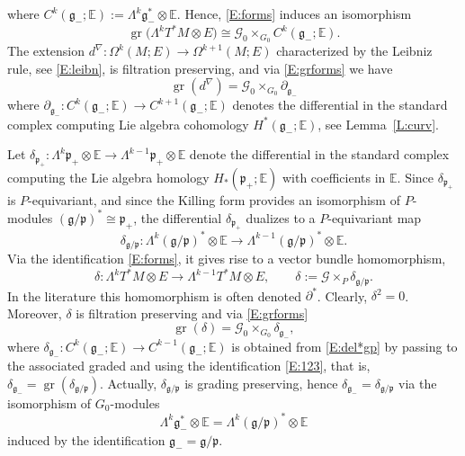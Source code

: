 \documentclass[reqno,12pt]{amsart}
\DeclareMathOperator{\gr}{gr}
\newcommand\goe{\mathfrak g}
\newcommand\poe{\mathfrak p}
\theoremstyle{plain}
\theoremstyle{definition}
\begin{document}
where $C^k(\goe_-;\mathbb E):=\Lambda^k\goe_-^*\otimes\mathbb E$. 
Hence, \eqref{E:forms} induces an isomorphism
\begin{equation}\label{E:grforms}
\gr\bigl(\Lambda^kT^*M\otimes E\bigr)
\cong\mathcal G_0\times_{G_0}C^k(\goe_-;\mathbb E).
\end{equation}
The extension $d^\nabla\colon\Omega^k(M;E)\to\Omega^{k+1}(M;E)$ characterized by the Leibniz rule, see \eqref{E:leibn}, is filtration preserving, and via \eqref{E:grforms} we have
\begin{equation}\label{E:grd}
\gr(d^\nabla)=\mathcal G_0\times_{G_0}\partial_{\goe_-}
\end{equation}
where $\partial_{\goe_-}\colon C^k(\goe_-;\mathbb E)\to C^{k+1}(\goe_-;\mathbb E)$ denotes the differential in the standard complex computing Lie algebra cohomology $H^*(\goe_-;\mathbb E)$, see Lemma~\ref{L:curv}.


Let $\delta_{\poe_+}\colon\Lambda^k\poe_+\otimes\mathbb E\to\Lambda^{k-1}\poe_+\otimes\mathbb E$ denote the differential in the standard complex computing the Lie algebra homology $H_*(\poe_+;\mathbb E)$ with coefficients in $\mathbb E$. 
Since $\delta_{\poe_+}$ is $P$-equivariant, and since the Killing form provides an isomorphism of $P$-modules $(\goe/\poe)^*\cong\poe_+$, the differential $\delta_{\poe_+}$ dualizes to a $P$-equivariant map
\begin{equation}\label{E:del*gp}
\delta_{\goe/\poe}\colon\Lambda^k(\goe/\poe)^*\otimes\mathbb E\to\Lambda^{k-1}(\goe/\poe)^*\otimes\mathbb E.
\end{equation}
Via the identification \eqref{E:forms}, it gives rise to a vector bundle homomorphism,
\begin{equation}\label{E:deltaVV}
\delta\colon\Lambda^kT^*M\otimes E\to\Lambda^{k-1}T^*M\otimes E,\qquad\delta:=\mathcal G\times_P\delta_{\goe/\poe}.
\end{equation}
In the literature \cite{CSS01,CS12,CS09} this homomorphism is often denoted $\partial^*$.
Clearly, $\delta^2=0$. 
Moreover, $\delta$ is filtration preserving and via \eqref{E:grforms}
\begin{equation}\label{E:grdel}
\gr(\delta)=\mathcal G_0\times_{G_0}\delta_{\goe_-},
\end{equation}
where $\delta_{\goe_-}\colon C^k(\goe_-;\mathbb E)\to C^{k-1}(\goe_-;\mathbb E)$ is obtained from \eqref{E:del*gp} by passing to the associated graded and using the identification \eqref{E:123}, that is, $\delta_{\goe_-}=\gr(\delta_{\goe/\poe})$.
Actually, $\delta_{\goe/\poe}$ is grading preserving, hence $\delta_{\goe_-}=\delta_{\goe/\poe}$ via the isomorphism of $G_0$-modules 
\begin{equation}\label{E:g-gp}
\Lambda^k\goe_-^*\otimes\mathbb E=\Lambda^k(\goe/\poe)^*\otimes\mathbb E
\end{equation}
induced by the identification $\goe_-=\goe/\poe$.
\end{document}
